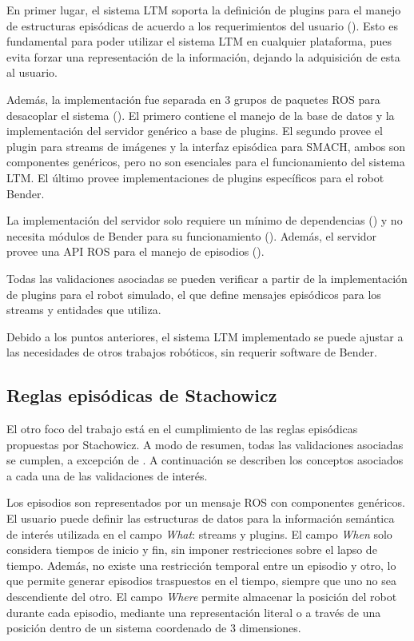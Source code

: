 En primer lugar, el sistema LTM soporta la definición de plugins para el manejo de estructuras episódicas de acuerdo a los requerimientos del usuario (). Esto es fundamental para poder utilizar el sistema LTM en cualquier plataforma, pues evita forzar una representación de la información, dejando la adquisición de esta al usuario.

Además, la implementación fue separada en 3 grupos de paquetes ROS para desacoplar el sistema (). El primero contiene el manejo de la base de datos y la implementación del servidor genérico a base de plugins. El segundo provee el plugin para streams de imágenes y la interfaz episódica para SMACH, ambos son componentes genéricos, pero no son esenciales para el funcionamiento del sistema LTM. El último provee implementaciones de plugins específicos para el robot Bender.

La implementación del servidor solo requiere un mínimo de dependencias () y no necesita módulos de Bender para su funcionamiento (). Además, el servidor provee una API ROS para el manejo de episodios ().

Todas las validaciones asociadas se pueden verificar a partir de la implementación de plugins para el robot simulado, el que define mensajes episódicos para los streams y entidades que utiliza.

Debido a los puntos anteriores, el sistema LTM implementado se puede ajustar a las necesidades de otros trabajos robóticos, sin requerir software de Bender.


\subsection{Reglas episódicas de Stachowicz}

El otro foco del trabajo está en el cumplimiento de las reglas episódicas propuestas por Stachowicz. A modo de resumen, todas las validaciones asociadas se cumplen, a excepción de . A continuación se describen los conceptos asociados a cada una de las validaciones de interés.

Los episodios son representados por un mensaje ROS con componentes genéricos. El usuario puede definir las estructuras de datos para la información semántica de interés utilizada en el campo \textit{What}: streams y plugins. El campo \textit{When} solo considera tiempos de inicio y fin, sin imponer restricciones sobre el lapso de tiempo. Además, no existe una restricción temporal entre un episodio y otro, lo que permite generar episodios traspuestos en el tiempo, siempre que uno no sea descendiente del otro. El campo \textit{Where} permite almacenar la posición del robot durante cada episodio, mediante una representación literal o a través de una posición dentro de un sistema coordenado de 3 dimensiones.

